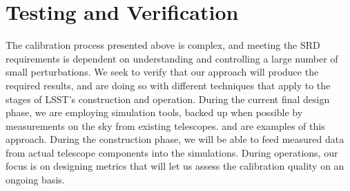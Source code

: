 \documentclass[12pt,preprint]{aastex}
\begin{document}
\begin{figure}
\centering
{}
\end{figure}

\section{Testing and Verification}
\label{sec:verification}

The calibration process presented above is complex, and meeting the SRD requirements
is dependent on understanding and controlling a large number of small perturbations.  We seek to verify that our approach will produce the required results, and are doing so with different techniques that apply to the stages of LSST's construction and operation.   During the current final design phase, we are employing simulation tools, backed up when possible by measurements on the sky from existing telescopes.   \citep{Burke2013} and \citep{Burke2010b} are examples of this approach.  During the construction phase, we will be able to feed measured data from actual telescope components into the simulations.   During operations, our focus is on designing metrics that will let us assess the calibration quality on an ongoing basis.
\end{document}
